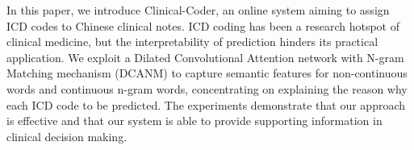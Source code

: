 In this paper, we introduce Clinical-Coder, an online system aiming to assign ICD codes to Chinese clinical notes. ICD coding has been a research hotspot of clinical medicine, but the interpretability of prediction hinders its practical application. We exploit a Dilated Convolutional Attention network with N-gram Matching mechanism (DCANM) to capture semantic features for non-continuous words and continuous n-gram words, concentrating on explaining the reason why each ICD code to be predicted. The experiments demonstrate that our approach is effective and that our system is able to provide supporting information in clinical decision making.
